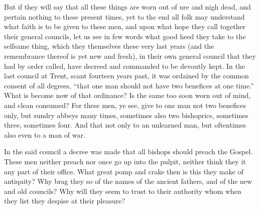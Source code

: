 But if they will say that all these things are worn
out of ure and nigh dead, and pertain nothing to these present times,
yet to the end all folk may understand what faith is to be given to
these men, and upon what hope they call together their general councils,
let us see in few words what good heed they take to the selfsame thing,
which they themselves these very last years (and the remembrance thereof
is yet new and fresh), in their own general council that they had by
order called, have decreed and commanded to be devoutly kept.
In the last council at Trent, scant fourteen years past, it was ordained
by the common consent of all degrees, “that one man should not
have two benefices at one time.” What is become now of that
ordinance? Is the same too soon worn out of mind, and clean consumed?
For these men, ye see, give to one man not two benefices only, but sundry
abbeys many times, sometimes also two bishoprics, sometimes three, sometimes
four. And that not only to an unlearned man, but oftentimes also
even to a man of war.

In the said council a decree was made that all bishops should preach
the Gospel. These men neither preach nor once go up into the pulpit,
neither think they it any part of their office. What great pomp
and crake then is this they make of antiquity? Why brag they so
of the names
of the ancient fathers, and of the new and old councils? Why will
they seem to trust to their authority whom when they list they despise
at their pleasure?

